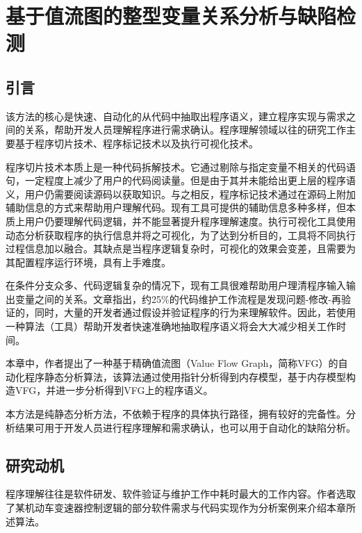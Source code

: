 
\chapter{基于值流图的整型变量关系分析与缺陷检测}

\section{引言}

该方法的核心是快速、自动化的从代码中抽取出程序语义，建立程序实现与需求之间的关系，帮助开发人员理解程序进行需求确认。程序理解\cite{boysen1979factors, sackman1968exploratory}领域以往的研究工作主要基于程序切片技术、程序标记技术以及执行可视化技术。

程序切片技术\cite{binkley1996program}本质上是一种代码拆解技术。它通过剔除与指定变量不相关的代码语句，一定程度上减少了用户的代码阅读量。但是由于其并未能给出更上层的程序语义，用户仍需要阅读源码以获取知识。与之相反，程序标记技术\cite{sulir2017labeling}通过在源码上附加辅助信息的方式来帮助用户理解代码。现有工具可提供的辅助信息多种多样，但本质上用户仍要理解代码逻辑，并不能显著提升程序理解速度。执行可视化工具使用动态分析获取程序的执行信息并将之可视化，为了达到分析目的，工具将不同执行过程信息加以融合。其缺点是当程序逻辑复杂时，可视化的效果会变差，且需要为其配置程序运行环境，具有上手难度。 

在条件分支众多、代码逻辑复杂的情况下，现有工具很难帮助用户理清程序输入输出变量之间的关系。文章指出，约25\%的代码维护工作流程是发现问题-修改-再验证的，同时，大量的开发者通过假设并验证程序的行为来理解软件\cite{maalej2014comprehension}。因此，若使用一种算法（工具）帮助开发者快速准确地抽取程序语义将会大大减少相关工作时间。

本章中，作者提出了一种基于精确值流图（Value Flow Graph，简称VFG）的自动化程序静态分析算法，该算法通过使用指针分析得到内存模型，基于内存模型构造VFG，并进一步分析得到VFG上的程序语义。

本方法是纯静态分析方法，不依赖于程序的具体执行路径，拥有较好的完备性。分析结果可用于开发人员进行程序理解和需求确认，也可以用于自动化的缺陷分析。

\section{研究动机}

程序理解往往是软件研发、软件验证与维护工作中耗时最大的工作内容。作者选取了某机动车变速器控制逻辑的部分软件需求与代码实现作为分析案例来介绍本章所述算法。

